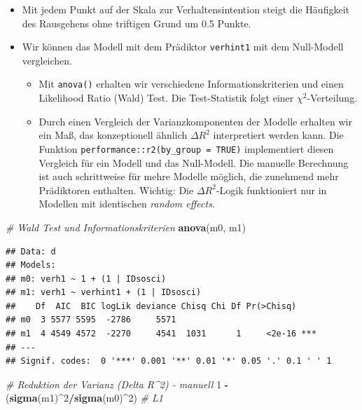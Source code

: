 \documentclass[
]{book}
\newenvironment{Shaded}{\begin{snugshade}}{\end{snugshade}}
\newcommand{\CommentTok}[1]{\textcolor[rgb]{0.56,0.35,0.01}{\textit{#1}}}
\newcommand{\DecValTok}[1]{\textcolor[rgb]{0.00,0.00,0.81}{#1}}
\newcommand{\KeywordTok}[1]{\textcolor[rgb]{0.13,0.29,0.53}{\textbf{#1}}}
\newcommand{\NormalTok}[1]{#1}
\newcommand{\OperatorTok}[1]{\textcolor[rgb]{0.81,0.36,0.00}{\textbf{#1}}}
\newcommand{\StringTok}[1]{\textcolor[rgb]{0.31,0.60,0.02}{#1}}
\providecommand{\tightlist}{%
  \setlength{\itemsep}{0pt}\setlength{\parskip}{0pt}}
\begin{document}
\begin{itemize}
\item
  Mit jedem Punkt auf der Skala zur Verhaltensintention steigt die Häufigkeit des Rausgehens ohne triftigen Grund um 0.5 Punkte.
\item
  Wir können das Modell mit dem Prädiktor \texttt{verhint1} mit dem Null-Modell vergleichen.

  \begin{itemize}
  \tightlist
  \item
    Mit \texttt{anova()} erhalten wir verschiedene Informationskriterien und einen Likelihood Ratio (Wald) Test. Die Test-Statistik folgt einer \(\chi^2\)-Verteilung.
  \item
    Durch einen Vergleich der Varianzkomponenten der Modelle erhalten wir ein Maß, das konzeptionell ähnlich \(\Delta R^2\) interpretiert werden kann. Die Funktion \texttt{performance::r2(by\_group\ =\ TRUE)} implementiert diesen Vergleich für ein Modell und das Null-Modell. Die manuelle Berechnung ist auch schrittweise für mehre Modelle möglich, die zunehmend mehr Prädiktoren enthalten. Wichtig: Die \(\Delta R^2\)-Logik funktioniert nur in Modellen mit identischen \emph{random effects}.
  \end{itemize}
\end{itemize}

\begin{Shaded}
\begin{Highlighting}[]
\CommentTok{# Wald Test und Informationskriterien}
\KeywordTok{anova}\NormalTok{(m0, m1)}
\end{Highlighting}
\end{Shaded}

\begin{verbatim}
## Data: d
## Models:
## m0: verh1 ~ 1 + (1 | IDsosci)
## m1: verh1 ~ verhint1 + (1 | IDsosci)
##    Df  AIC  BIC logLik deviance Chisq Chi Df Pr(>Chisq)    
## m0  3 5577 5595  -2786     5571                            
## m1  4 4549 4572  -2270     4541  1031      1     <2e-16 ***
## ---
## Signif. codes:  0 '***' 0.001 '**' 0.01 '*' 0.05 '.' 0.1 ' ' 1
\end{verbatim}

\begin{Shaded}
\begin{Highlighting}[]
\CommentTok{# Reduktion der Varianz (Delta R^2) - manuell}
\DecValTok{1} \OperatorTok{-}\StringTok{ }\NormalTok{(}\KeywordTok{sigma}\NormalTok{(m1)}\OperatorTok{^}\DecValTok{2}\OperatorTok{/}\KeywordTok{sigma}\NormalTok{(m0)}\OperatorTok{^}\DecValTok{2}\NormalTok{)  }\CommentTok{# L1}
\end{Highlighting}
\end{Shaded}
\end{document}
